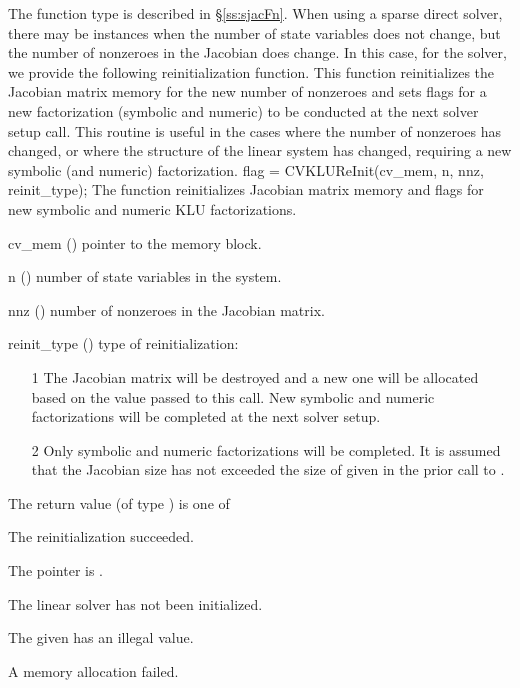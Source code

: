 {
  The function type  is described in \S\ref{ss:sjacFn}.
}
When using a sparse direct solver, there 
may be instances when the number of state variables does not 
change, but the number of nonzeroes in the Jacobian does change.  
In this case, for the {\cvklu} solver, we provide the following reinitialization
function.  This function reinitializes the Jacobian matrix
memory for the new number of nonzeroes and sets flags for a new factorization 
(symbolic and numeric) to be conducted at the next solver setup
call.  This routine is useful in the cases where the number of nonzeroes 
has changed, or where the structure of the linear system has changed,
requiring a new symbolic (and numeric) factorization.
{
  flag = CVKLUReInit(cv\_mem, n, nnz, reinit\_type);
}
{
  The function  reinitializes Jacobian matrix memory and flags for
  new symbolic and numeric KLU factorizations.
}
{
  \begin{args}[cv\_mem]
  \item[cv\_mem] ()
    pointer to the {\cvodes} memory block.
  \item[n] ()
    number of state variables in the system.
  \item[nnz] ()
    number of nonzeroes in the Jacobian matrix.
  \item[reinit\_type] ()
    type of reinitialization:
    \begin{itemize}
    \item[1]  The Jacobian matrix will be destroyed and a new one will 
      be allocated based on the  value passed to this call. New symbolic and
      numeric factorizations will be completed at the next
      solver setup.
    \item[2]  Only symbolic and numeric factorizations will be completed.  
      It is assumed that the Jacobian size has not exceeded the size of 
       given in the prior call to {\cvklu}.
    \end{itemize}
  \end{args}
}
{
  The return value  (of type ) is one of
  \begin{args}
  \item[\Id{CVSLS\_SUCCESS}] 
    The reinitialization succeeded.
  \item[\Id{CVSLS\_MEM\_NULL}]
    The  pointer is .
  \item[\Id{CVSLS\_LMEM\_NULL}]
    The {\cvklu} linear solver has not been initialized.
  \item[\Id{CVSLS\_ILL\_INPUT}]
    The given  has an illegal value.
  \item[\Id{CVSLS\_MEM\_FAIL}]
    A memory allocation failed.
  \end{args}
}
